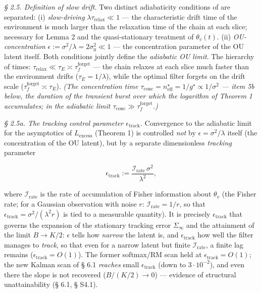 \documentclass[12pt]{iopart}
\begin{document}
\emph{§ 2.5. Definition of slow drift.} Two distinct adiabaticity conditions of \cite{Andriishin2026b} are separated: (i) \emph{slow-driving} \(\lambda\tau_{\text{relax}} \ll 1\) --- the characteristic drift time of the environment is much larger than the relaxation time of the chain at each slice; necessary for Lemma 2 and the quasi-stationary treatment of \(\theta_v(t)\). (ii) \emph{OU-concentration} \(\epsilon := \sigma^2/\lambda = 2\sigma_0^2 \ll 1\) --- the concentration parameter of the OU latent itself. Both conditions jointly define the \emph{adiabatic OU limit}. The hierarchy of times: \(\tau_{\text{relax}} \ll \tau_E \asymp \tau_f^{\text{forget}}\) --- the chain relaxes at each slice much faster than the environment drifts (\(\tau_E = 1/\lambda\)), while the optimal filter forgets on the drift scale (\(\tau_f^{\text{forget}} \asymp \tau_E\)). \emph{(The concentration time \(\tau_{\text{conc}} = n_{\text{eff}}^\star = 1/g^\star \propto 1/\sigma^2\) --- item 5b below, the duration of the transient burst over which the logarithm of Theorem 1 accumulates; in the adiabatic limit \(\tau_{\text{conc}} \gg \tau_f^{\text{forget}}\).)}



\emph{§ 2.5a. The tracking control parameter \(\epsilon_{\text{track}}\).} Convergence to the adiabatic limit for the asymptotics of \(L_{\text{excess}}\) (Theorem 1) is controlled \emph{not} by \(\epsilon = \sigma^2/\lambda\) itself (the concentration of the OU latent), but by a separate dimensionless \emph{tracking} parameter



\begin{equation}\epsilon_{\text{track}} := \frac{\mathcal I_{\text{rate}}\,\sigma^2}{\lambda^2}, \tag{2.2}\end{equation}



where \(\mathcal I_{\text{rate}}\) is the rate of accumulation of Fisher information about \(\theta_v\) (the Fisher rate; for a Gaussian observation with noise \(r\): \(\mathcal I_{\text{rate}} = 1/r\), so that \(\epsilon_{\text{track}} = \sigma^2/(\lambda^2 r)\) is tied to a measurable quantity). It is precisely \(\epsilon_{\text{track}}\) that governs the expansion of the stationary tracking error \(\Sigma_\infty\) and the attainment of the limit \(B \to K/2\): \(\epsilon\) tells how \emph{narrow} the latent is, and \(\epsilon_{\text{track}}\) how well the filter manages to \emph{track}, so that even for a narrow latent but finite \(\mathcal I_{\text{rate}}\), a finite lag remains (\(\epsilon_{\text{track}} = O(1)\)). The former softmax/RM scan \cite{Andriishin2026b} held at \(\epsilon_{\text{track}} = O(1)\); the new Kalman scan of § 6.1 \emph{reaches} small \(\epsilon_{\text{track}}\) (down to \(3\cdot10^{-2}\)), and even there the slope is not recovered (\(B/(K/2)\to0\)) --- evidence of structural unattainability (§ 6.1, § S4.1).
\end{document}
